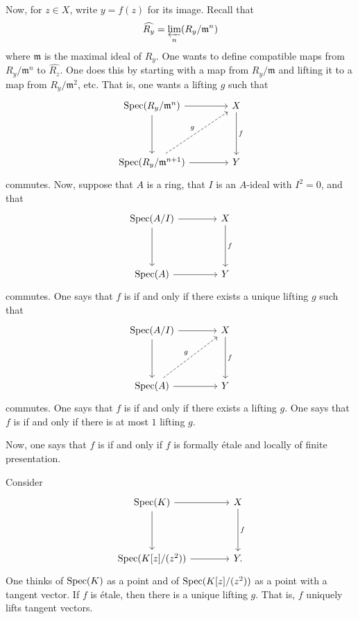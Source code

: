 \documentclass [11 pt, oneside] {article}
\begin{document}
Now, for $z\in X$, write $y = f(z)$ for its image. Recall that
\begin{align*}
	\widehat{R_{y}} = \varprojlim_{n} (R_{y}/\mathfrak{m}^{n})
\end{align*}
where $\mathfrak{m}$ is the maximal ideal of $R_{y}$.
One wants to define compatible maps from $R_{y}/\mathfrak{m}^{n}$ to $\widehat{R_{z}}$.
One does this by starting with a map from $R_{y}/\mathfrak{m}$ and lifting it to a map from $R_{y}/\mathfrak{m}^{2}$, etc.
That is, one wants a lifting $g$ such that
\[
\begin{tikzcd}[sep = 4 em]
	\Spec(R_{y}/\mathfrak{m}^{n}) \ar[d]\ar[r]& X\ar[d,"f"]\\
	\Spec(R_{y}/\mathfrak{m}^{n+1}) \ar[r]\ar[ur,dashed,"g"] &Y
\end{tikzcd}
\]
commutes.
Now, suppose that $A$ is a ring, that $I$ is an $A$-ideal with $I^{2}=0$, and that
\[
\begin{tikzcd}[sep = 4 em]
	\Spec(A/I)\ar[r]\ar[d]& X\ar[d,"f"]\\
	\Spec (A) \ar[r] &Y
\end{tikzcd}
\]
commutes. One says that $f$ is  if and only if there exists a unique lifting $g$ such that
\[
\begin{tikzcd}[sep = 4 em]
	\Spec(A/I) \ar[r]\ar[d]& X\ar[d,"f"]\\
	\Spec(A)\ar[r]\ar[ur,dashed,"g"] & Y
\end{tikzcd}
\]
commutes.
One says that $f$ is  if and only if there exists a lifting $g$. One says that $f$ is  if and only if there is at most $1$ lifting $g$.

Now, one says that $f$ is  if and only if $f$ is formally \'etale and locally of finite presentation.

\begin{example}[ ]\label{}\text{}
Consider
\[
\begin{tikzcd}[sep = 4 em]
	\Spec(K)\ar[r] \ar[d] & X\ar[d,"f"]\\
	\Spec (K[z]/(z^{2})) \ar[r]&Y.
\end{tikzcd}
\]
One thinks of $\operatorname{Spec}(K)$ as a point and of $\operatorname{Spec}(K[z]/(z^{2}))$ as a point with a tangent vector. 
If $f$ is \'etale, then there is a unique lifting $g$. That is, $f$ uniquely lifts tangent vectors. 
\end{example}
\end{document}
